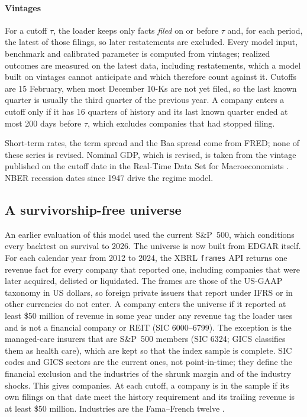 \paragraph{Vintages} For a cutoff $\tau$, the loader keeps only facts \emph{filed} on or before $\tau$ and, for each period, the latest of those filings, so later restatements are excluded. Every model input, benchmark and calibrated parameter is computed from vintages; realized outcomes are measured on the latest data, including restatements, which a model built on vintages cannot anticipate and which therefore count against it. Cutoffs are 15 February, when most December 10-Ks are not yet filed, so the last known quarter is usually the third quarter of the previous year. A company enters a cutoff only if it has 16 quarters of history and its last known quarter ended at most 200 days before $\tau$, which excludes companies that had stopped filing.

Short-term rates, the term spread and the Baa spread come from FRED; none of these series is revised. Nominal GDP, which is revised, is taken from the vintage published on the cutoff date in the Real-Time Data Set for Macroeconomists \citep{croushore2001}. NBER recession dates since 1947 drive the regime model.

\subsection{A survivorship-free universe}
An earlier evaluation of this model used the current S\&P~500, which conditions every backtest on survival to 2026. The universe is now built from EDGAR itself. For each calendar year from 2012 to 2024, the XBRL \texttt{frames} API returns one revenue fact for every company that reported one, including companies that were later acquired, delisted or liquidated. The frames are those of the US-GAAP taxonomy in US dollars, so foreign private issuers that report under IFRS or in other currencies do not enter. A company enters the universe if it reported at least \$50 million of revenue in some year under any revenue tag the loader uses and is not a financial company or REIT (SIC 6000--6799). The exception is the managed-care insurers that are S\&P~500 members (SIC 6324; GICS classifies them as health care), which are kept so that the index sample is complete. SIC codes and GICS sectors are the current ones, not point-in-time; they define the financial exclusion and the industries of the shrunk margin and of the industry shocks. This gives \UniverseN{} companies. At each cutoff, a company is in the sample if its own filings on that date meet the history requirement and its trailing revenue is at least \$50 million. Industries are the Fama--French twelve \citep{french_data}.

